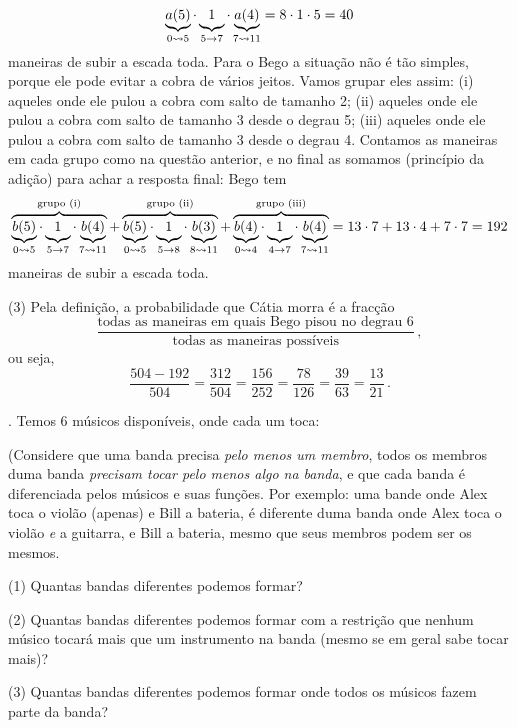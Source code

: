 $$
\underbrace{a(5)}_{0 \transto 5} \ntimes
\underbrace{\phantom(1\phantom)}_{5 \to 7} \ntimes
\underbrace{a(4)}_{7 \transto 11}
=
8 \ntimes 1 \ntimes 5
= 40
$$
maneiras de subir a escada toda.
Para o Bego a situação não é tão simples, porque ele pode evitar a cobra de vários jeitos.
Vamos grupar eles assim:
(i)   aqueles onde ele pulou a cobra com salto de tamanho 2;
(ii)  aqueles onde ele pulou a cobra com salto de tamanho 3 desde o degrau 5;
(iii) aqueles onde ele pulou a cobra com salto de tamanho 3 desde o degrau 4.
Contamos as maneiras em cada grupo como na questão anterior, e no final as somamos (princípio da adição) para achar a resposta final: Bego tem
$$
\overbrace{
\underbrace{b(5)}_{0 \transto 5} \ntimes
\underbrace{\phantom(1\phantom)}_{5 \to 7} \ntimes
\underbrace{b(4)}_{7 \transto 11}
}^{\text{grupo (i)}}
+
\overbrace{
\underbrace{b(5)}_{0 \transto 5} \ntimes
\underbrace{\phantom(1\phantom)}_{5 \to 8} \ntimes
\underbrace{b(3)}_{8 \transto 11}
}^{\text{grupo (ii)}}
+
\overbrace{
\underbrace{b(4)}_{0 \transto 4} \ntimes
\underbrace{\phantom(1\phantom)}_{4 \to 7} \ntimes
\underbrace{b(4)}_{7 \transto 11}
}^{\text{grupo (iii)}}
=
13 \ntimes 7 + 
13 \ntimes 4 + 
7 \ntimes 7 
=
192
$$
maneiras de subir a escada toda.
\item{(3)}
Pela definição, a probabilidade que Cátia morra é a fracção
$$
\frac
{\text{todas as maneiras em quais Bego pisou no degrau 6}}
{\text{todas as maneiras possíveis}}\,,
$$
ou seja,
$$
\frac
{504-192}
{504}
=
\frac
{312}
{504}
=
\frac
{156}
{252}
=
\frac
{78}
{126}
=
\frac
{39}
{63}
=
\frac
{13}
{21}
\,.
$$

\endproblem

\problem.
Temos $6$ músicos disponíveis, onde cada um toca:
\endgraf
{}

\noindent
(Considere que uma banda precisa \emph{pelo menos um membro},
todos os membros duma banda \emph{precisam tocar pelo menos algo na banda},
e que cada banda é diferenciada pelos músicos e
suas funções.
Por exemplo: uma bande onde Alex toca o violão (apenas) e Bill a bateria,
é diferente duma banda onde
Alex toca o violão \emph{e} a guitarra, e Bill a bateria,
mesmo que seus membros podem ser os mesmos.

\item{(1)}
Quantas bandas diferentes podemos formar?
\item{(2)}
Quantas bandas diferentes podemos formar com a restrição que nenhum
músico tocará mais que um instrumento na banda (mesmo se em geral sabe tocar mais)?
\item{(3)}
Quantas bandas diferentes podemos formar onde todos os
músicos fazem parte da banda?

